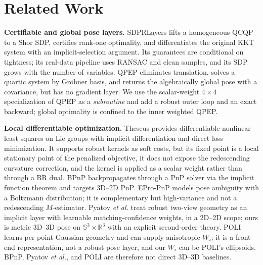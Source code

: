 \section{Related Work}
\label{sec:related}

\noindent\textbf{Certifiable and global pose layers.} SDPRLayers \cite{holmes2025sdpr} lifts a
homogeneous QCQP to a Shor SDP, certifies rank-one optimality, and differentiates the original KKT
system with an implicit-selection argument. Its guarantees are conditional on tightness; its
real-data pipeline uses RANSAC and clean samples, and its SDP grows with the number of variables.
QPEP \cite{wu2022qpep} eliminates translation, solves a quartic system by Gr\"obner basis, and
returns the algebraically global pose with a covariance, but has no gradient layer. We use the
scalar-weight $4\times4$ specialization of QPEP as a \emph{subroutine} and add a robust outer loop
and an exact backward; global optimality is confined to the inner weighted QPEP.

\noindent\textbf{Local differentiable optimization.} Theseus \cite{pineda2022theseus} provides
differentiable nonlinear least squares on Lie groups with implicit differentiation and direct loss
minimization. It supports robust kernels as soft costs, but its fixed point is a local stationary
point of the penalized objective, it does not expose the redescending curvature correction, and the
kernel is applied as a scalar weight rather than through a BR dual. BPnP \cite{chen2020bpn}
backpropagates through a PnP solver via the implicit function theorem and targets 3D--2D PnP. EPro-PnP
\cite{chen2022epropnp} models pose ambiguity with a Boltzmann distribution; it is complementary but
high-variance and not a redescending $M$-estimator. Pyatov \emph{et al.}
\cite{pyatov2024robust} treat robust two-view geometry as an implicit layer with learnable
matching-confidence weights, in a 2D--2D scope; ours is metric 3D--3D pose on
$\mathbb{S}^3\times\mathbb{R}^3$ with an explicit second-order theory. POLI \cite{poli2026} learns
per-point Gaussian geometry and can supply anisotropic $W_i$; it is a front-end representation, not
a robust pose layer, and our $W_i$ can be POLI's ellipsoids. BPnP, Pyatov \emph{et al.}, and POLI
are therefore not direct 3D--3D baselines.

